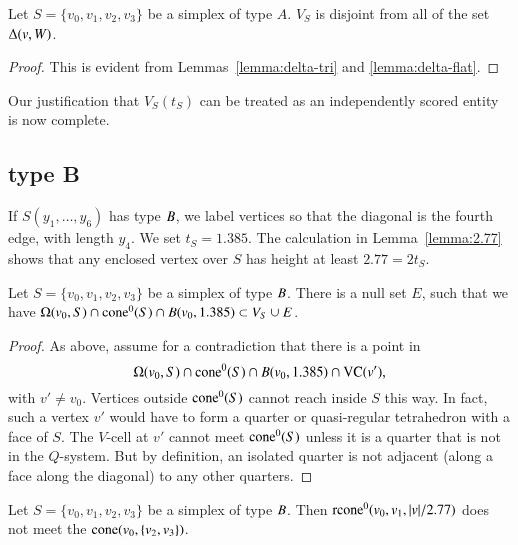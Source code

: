\begin{lemma} Let $S=\{v_0,v_1,v_2,v_3\}$ be a simplex of type $A$.
  $V_S$ is disjoint from all of the set $\Delta(v,W)$.
\end{lemma}

\begin{proof}
This is evident from
Lemmas~\ref{lemma:delta-tri} and \ref{lemma:delta-flat}.
\end{proof}


Our justification that $V_S(t_S)$ can be treated as an
independently scored entity is now complete.

\subsection{type B}%

If $S(y_1,\ldots,y_6)$ has type $B$, we label vertices so that
the diagonal is the fourth edge, with length $y_4$. We set
$t_S=1.385$. The calculation in Lemma~\ref{lemma:2.77}
shows that any enclosed vertex over $S$ has height at least
$2.77=2t_S$.

\begin{lemma} Let $S=\{v_0,v_1,v_2,v_3\}$ be a simplex of type $B$.
There is a null set $E$, such that
we have  $ \Omega(v_0,S) \cap {\operatorname{cone}}^0(S) \cap B(v_0,1.385) 
\subset V_S \cup E$.
\end{lemma}

\begin{proof}  As above, assume for a contradiction that there
is a point in 
 $$\Omega(v_0,S)\cap {\operatorname{cone}}^0(S) \cap B(v_0,1.385)\cap {\operatorname{VC}}(v'),$$
with $v'\ne v_0$.
Vertices outside ${\operatorname{cone}}^0(S)$ cannot reach inside $S$ this way.  In
fact, such a vertex $v'$ would have to form a quarter or
quasi-regular tetrahedron with a face of $S$.  The $V$-cell at
$v'$ cannot meet ${\operatorname{cone}}^0(S)$ unless it is a quarter that is not in the
$Q$-system. But by definition, an isolated quarter is not adjacent
(along a face along the diagonal) to any other quarters.
\end{proof}


\begin{lemma} Let $S=\{v_0,v_1,v_2,v_3\}$ be a simplex of type $B$.
Then  ${\operatorname{rcone}}^0(v_0,v_1,|v|/2.77)$ does not meet the
${\operatorname{cone}}(v_0,\{v_2,v_3\})$.
\end{lemma}


